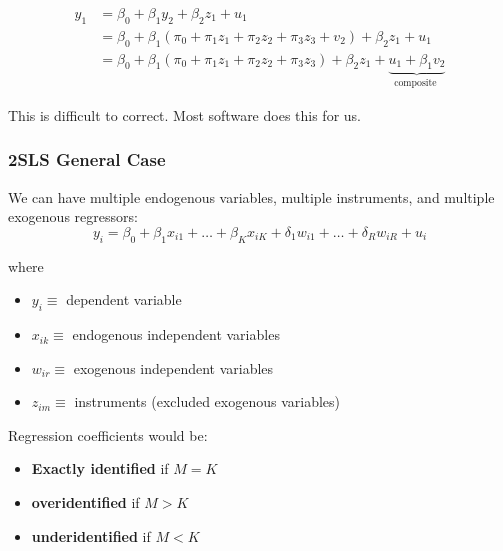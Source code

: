 \documentclass[11pt]{article}
\begin{document}
\begin{equation}
\begin{aligned}
y_1 & =\beta_0+\beta_1 y_2+\beta_2 z_1+u_1 \\
& =\beta_0+\beta_1\left(\pi_0+\pi_1 z_1+\pi_2 z_2+\pi_3 z_3+v_2\right)+\beta_2 z_1+u_1 \\
& =\beta_0+\beta_1\left(\pi_0+\pi_1 z_1+\pi_2 z_2+\pi_3 z_3\right)+\beta_2 z_1+\underbrace{u_1+\beta_1 v_2}_{\text {composite }}
\end{aligned}
\end{equation}

This is difficult to correct. Most software does this for us.

\subsubsection{2SLS General Case}

We can have multiple endogenous variables, multiple instruments, and multiple exogenous regressors:
\[y_i=\beta_0+\beta_1 x_{i 1}+\ldots+\beta_K x_{i K}+\delta_1 w_{i 1}+\ldots+\delta_R w_{i R}+u_i\]

where
\begin{itemize}
    \item $y_i \equiv$ dependent variable
    \item $x_{ik} \equiv$ endogenous independent variables
    \item $w_{ir} \equiv$ exogenous independent variables
    \item $z_{im} \equiv$ instruments (excluded exogenous variables)
\end{itemize}

\begin{definition}
    Regression coefficients would be:
    \begin{itemize}
        \item \textbf{Exactly identified} if $M=K$
        \item \textbf{overidentified} if $M>K$
        \item \textbf{underidentified} if $M<K$
    \end{itemize}
\end{definition}
\end{document}
